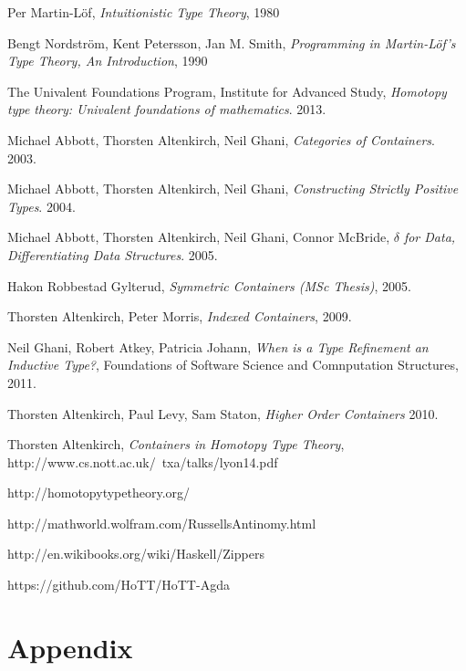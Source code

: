 \documentclass[12pt]{report}
\begin{document}
\begin{thebibliography}{10}

  Per Martin-L\"of,
  \emph{Intuitionistic Type Theory},
  1980

  Bengt Nordstr\"om, Kent Petersson, Jan M. Smith,
  \emph{Programming in Martin-L\"of's Type Theory, An Introduction},
  1990

  The Univalent Foundations Program, Institute for Advanced Study,
  \emph{Homotopy type theory: Univalent foundations of mathematics}.
  2013.

  Michael Abbott, Thorsten Altenkirch, Neil Ghani,
  \emph{Categories of Containers}.
  2003.

  Michael Abbott, Thorsten Altenkirch, Neil Ghani,
  \emph{Constructing Strictly Positive Types}.
  2004.
  
  Michael Abbott, Thorsten Altenkirch, Neil Ghani, Connor McBride,
  \emph{$\delta$ for Data, Differentiating Data Structures}.
  2005.

  Hakon Robbestad Gylterud,
  \emph{Symmetric Containers (MSc Thesis)},
  2005.
  
  Thorsten Altenkirch, Peter Morris,
  \emph{Indexed Containers},
  2009.
  
  Neil Ghani, Robert Atkey, Patricia Johann,
  \emph{When is a Type Refinement an Inductive Type?},
  Foundations of Software Science and Comnputation Structures,
  2011.
  
  Thorsten Altenkirch, Paul Levy, Sam Staton,
  \emph{Higher Order Containers}
  2010.
  
  Thorsten Altenkirch,
  \emph{Containers in Homotopy Type Theory},
  http://www.cs.nott.ac.uk/~txa/talks/lyon14.pdf
  
  http://homotopytypetheory.org/
  
  http://mathworld.wolfram.com/RussellsAntinomy.html
  
  http://en.wikibooks.org/wiki/Haskell/Zippers
  
  https://github.com/HoTT/HoTT-Agda

\end{thebibliography}
\cleardoublepage
{}
{}

\chapter{Appendix}
\end{document}
